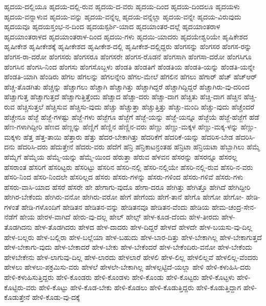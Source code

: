 {ಹೃದಯ-ದಲ್ಲಿಯೂ
ಹೃದಯ-ದಲ್ಲಿ-ರುವ
ಹೃದಯ-ದ-ವರು
ಹೃದಯ-ದಿಂದ
ಹೃದಯ-ದಿಂದಲೂ
ಹೃದಯಳು
ಹೃದಯ-ವನ್ನಾಳುವ
ಹೃದಯ-ವನ್ನು
ಹೃದಯ-ವನ್ನೆಲ್ಲ
ಹೃದಯ-ವನ್ನೆಲ್ಲಾ
ಹೃದಯ-ವನ್ನೇ
ಹೃದಯ-ವಿರುವುದು
ಹೃದಯವೂ
ಹೃದಯಸ್ತಂಭ-ನ-ದಿಂದ
ಹೃದಯಸ್ಪರ್ಶಿ-ಯಾದ
ಹೃದಯಾಂತರ-ದಲ್ಲೆ
ಹೃದಯಾಂತರಾಳ
ಹೃದಯಾಂತರಾಳದ
ಹೃದಯಾಂತರಾಳ-ದಿಂದ
ಹೃದಯಿ-ಗಳು
ಹೃದಯಿ-ಯಾದರು
ಹೃದಯೇಶ್ವರಿಯೇ
ಹೃಷಿಕೇಶದ
ಹೃಷೀಕೇಶ
ಹೃಷೀಕೇಶಕ್ಕೆ
ಹೃಷೀಕೇಶದ
ಹೃಷೀಕೇಶ-ದಲ್ಲಿ
ಹೃಷೀಕೇಶ-ದಲ್ಲಿದ್ದರು
ಹೆಂಗಸನ್ನು
ಹೆಂಗಸರ
ಹೆಂಗಸ-ರನ್ನು
ಹೆಂಗಸ-ರಾ-ದರೋ
ಹೆಂಗಸರು
ಹೆಂಗಸರೂ
ಹೆಂಗಸರೇ
ಹೆಂಗಸ-ರೊಡನೆ
ಹೆಂಗಸಾಗಿ
ಹೆಂಗಸಾ-ದರೋ
ಹೆಂಗಸಿಗೂ
ಹೆಂಗಸಿನ
ಹೆಂಗಸಿ-ನಿಂದ
ಹೆಂಗಸು
ಹೆಂಗಸೊಬ್ಬಳು
ಹೆಂಡತಿ
ಹೆಂಡತಿಗೆ
ಹೆಂಡತಿಯ
ಹೆಂಡತಿ-ಯನ್ನು
ಹೆಂಡತಿ-ಯನ್ನೇ
ಹೆಂಡತಿ-ಯಾಗಿ
ಹೆಂಡಿರು
ಹೆಗಲ
ಹೆಗಲನ್ನು
ಹೆಗಲನ್ನೇರಿ
ಹೆಗಲ-ಮೇಲೆ
ಹೆಗಲಿನ
ಹೆಗಲು
ಹೆಗಾರ್
ಹೆಚ್
ಹೆಚ್ಆರ್
ಹೆಚ್ಚ-ತೊಡಗಿತು
ಹೆಚ್ಚನ್ನು
ಹೆಚ್ಚಾಗಲು
ಹೆಚ್ಚಾಗಿ
ಹೆಚ್ಚಾಗಿತ್ತು
ಹೆಚ್ಚಾಗಿದ್ದರೆ
ಹೆಚ್ಚಾಗಿದ್ದಿದ್ದರೆ
ಹೆಚ್ಚಾಗಿರು-ವು-ದರಿಂದ
ಹೆಚ್ಚಾಗುತ್ತ
ಹೆಚ್ಚಾಗುತ್ತದೆ
ಹೆಚ್ಚಾಗುತ್ತಿತ್ತೆಂದು
ಹೆಚ್ಚಾದ
ಹೆಚ್ಚಾ-ದರು
ಹೆಚ್ಚಾ-ದಾಗ
ಹೆಚ್ಚಿತು
ಹೆಚ್ಚಿ-ದಾಗ
ಹೆಚ್ಚಿನ
ಹೆಚ್ಚಿ-ರುವ
ಹೆಚ್ಚಿಸುತ್ತಲೆ
ಹೆಚ್ಚಿಸುವ
ಹೆಚ್ಚಿಸು-ವುದು
ಹೆಚ್ಚು
ಹೆಚ್ಚುತ್ತಾ
ಹೆಚ್ಚುತ್ತಿತ್ತು
ಹೆಚ್ಚು-ಮಂದಿ
ಹೆಚ್ಚು-ವುದು
ಹೆಚ್ಚೆಂದರೆ
ಹೆಚ್ಚೇನೂ
ಹೆಜ್ಜೆ
ಹೆಜ್ಜೆ-ಗಳಷ್ಟು
ಹೆಜ್ಜೆ-ಗಳು
ಹೆಜ್ಜೆಗೂ
ಹೆಜ್ಜೆಗೆ
ಹೆಜ್ಜೆ-ಯನ್ನು
ಹೆಜ್ಜೆ-ಯನ್ನೂ
ಹೆಜ್ಜೆಯೆ
ಹೆಜ್ಜೆ-ಹೆಜ್ಜೆಗೆ
ಹೆಡೆ
ಹೆಣ-ಗಳಾಗಿದ್ದೀರಿ
ಹೆಣದ
ಹೆಣ್ಣನ್ನು
ಹೆಣ್ಣಿಗೆ
ಹೆಣ್ಣಿನ
ಹೆಣ್ಣಿನ-ವರು
ಹೆಣ್ಣು
ಹೆಣ್ಣು-ಮಕ್ಕಳ
ಹೆಣ್ಣು-ಮಕ್ಕ-ಳನ್ನು
ಹೆಣ್ಣು-ಮಕ್ಕಳು
ಹೆತ್ತ
ಹೆತ್ತ-ತಾಯಿ
ಹೆತ್ತಾರು
ಹೆತ್ತು
ಹೆದರ-ಬೇಕಾಗಿತ್ತು
ಹೆದರಿಕೆಗೆ
ಹೆದರಿಕೆ-ಯನ್ನು
ಹೆದರಿಸ-ಬೇಡ
ಹೆದರಿಸಿ-ದನು
ಹೆದರಿಸಿ-ದರು
ಹೆದುತ್ತೇನೆ
ಹೆದರು-ವರು
ಹೆದೆಗೆ
ಹೆನ್ರಿ
ಹೆನ್ರಿಕಾಟನ್ರಂತಹ
ಹೆನ್ರಿಟಾ
ಹೆನ್ರಿಯಟಾ
ಹೆಬ್ಬಾಗಿಲು
ಹೆಮ್ಮೆ
ಹೆಮ್ಮೆಗೆ
ಹೆಮ್ಮೆಯ
ಹೆಮ್ಮೆ-ಯನ್ನು
ಹೆಮ್ಮೆ-ಯಿಂದ
ಹೆರುತ್ತಾ
ಹೆರುವ
ಹೆಳವನ
ಹೆಸರನ್ನು
ಹೆಸರನ್ನೂ
ಹೆಸರಲ್ಲ
ಹೆಸರಾಂತ
ಹೆಸರಿಗೆ
ಹೆಸರಿಟ್ಟರು
ಹೆಸರಿಟ್ಟು
ಹೆಸರಿನ
ಹೆಸರಿ-ನಲ್ಲಿ
ಹೆಸರಿ-ನಲ್ಲಿಯೇ
ಹೆಸರಿ-ನಲ್ಲಿ-ರುವ
ಹೆಸರಿ-ನ-ವರು
ಹೆಸರಿ-ನಿಂದ
ಹೆಸರಿ-ನಿಂದಲೇ
ಹೆಸರಿಲ್ಲದ
ಹೆಸರು
ಹೆಸರು-ಗಳನ್ನು
ಹೆಸರು-ಗಳಿಂದ
ಹೆಸರು-ಗಳಿವೆ
ಹೆಸರು-ಗಳು
ಹೆಸರು-ವಾಸಿ-ಯಾದ
ಹೆಸರೆ
ಹೆಸರೇ
ಹೇ
ಹೇಗಾಗು-ವುದೊ
ಹೇಗಾ-ದರೂ
ಹೇಗಿತ್ತು
ಹೇಗಿತ್ತೊ
ಹೇಗಿದೆ
ಹೇಗಿದ್ದೀರಿ
ಹೇಗಿರ-ಬೇಕೆಂದು
ಹೇಗಿರು-ವನೋ
ಹೇಗಿರು-ವರೋ
ಹೇಗೆ
ಹೇಗೆಂದು
ಹೇಗೆ-ತಾನೆ
ಹೇಗೊ
ಹೇಗೋ
ಹೇಗೋ-
ಹೇಡಿ-ಗಳಂತೆ
ಹೇಡಿ-ಗಳೊಂದಿಗೆ
ಹೇಡಿತನ
ಹೇಡಿತನ-ವನ್ನು
ಹೇಡಿತನವೂ
ಹೇಡಿತನ-ವೆಂದು
ಹೇಡಿಯ
ಹೇಮ-ಚಂದ್ರ-ಸೇನ-ನೆಡೆಗೆ
ಹೇಯ
ಹೇರಳ-ವಾಗಿದೆ
ಹೇರು-ವು-ದಲ್ಲ
ಹೇಲ್
ಹೇಲ್ಸ್
ಹೇಳ-ಕೂಡ-ದೆಂದು
ಹೇಳ-ತೀರದು
ಹೇಳ-ತೊಡಗಿದನು
ಹೇಳ-ತೊಡಗಿದರು
ಹೇಳದ
ಹೇಳ-ದಾದರು
ಹೇಳ-ದಿದ್ದರೆ
ಹೇಳದೆ
ಹೇಳದೇ
ಹೇಳ-ಬಯಸು-ವು-ದಿಲ್ಲ
ಹೇಳ-ಬಲ್ಲರು
ಹೇಳ-ಬಲ್ಲಿರಾ
ಹೇಳ-ಬಲ್ಲೆಯಾ
ಹೇಳ-ಬಹುದು
ಹೇಳ-ಬಾರ-ದಿತ್ತು
ಹೇಳ-ಬೇಕಾಗಿಲ್ಲ
ಹೇಳ-ಬೇಕಾಗುತ್ತದೆ
ಹೇಳ-ಬೇಕಾಗು-ವುದು
ಹೇಳ-ಬೇಕಾದರೆ
ಹೇಳ-ಬೇಕು
ಹೇಳ-ಬೇಕೆಂದರೆ
ಹೇಳ-ಬೇಕೆಂದಿರು-ವನೋ
ಹೇಳ-ಬೇಕೆಂದು
ಹೇಳಬೇಕೇನು
ಹೇಳ-ಲಾಗುವು-ದಿಲ್ಲ
ಹೇಳ-ಲಾರದು
ಹೇಳಲಾರೆ
ಹೇಳಲಿ
ಹೇಳ-ಲಿಲ್ಲ
ಹೇಳಲಿಲ್ಲವೆ
ಹೇಳಲಿಲ್ಲ-ವೆಂದರು
ಹೇಳಲು
ಹೇಳಲು-ಪಕ್ರಮಿಸು-ವರು
ಹೇಳಲೆ
ಹೇಳಲೇ-ಬೇಕಾಗಿಲ್ಲ
ಹೇಳಲ್ಪಟ್ಟಿದೆ-ಯಲ್ಲಾ
ಹೇಳಿ
ಹೇಳಿ-ಕಳುಹಿಸಿ-ದರು
ಹೇಳಿ-ಕಳುಹಿಸುತ್ತಿದ್ದರು
ಹೇಳಿ-ಕೊಂಡರು
ಹೇಳಿ-ಕೊಂಡಳು
ಹೇಳಿ-ಕೊಂಡು
ಹೇಳಿ-ಕೊಟ್ಟರು
ಹೇಳಿ-ಕೊಟ್ಟಳು
ಹೇಳಿ-ಕೊಟ್ಟಿರು-ವರು
ಹೇಳಿ-ಕೊಟ್ಟು
ಹೇಳಿ-ಕೊಡ-ಬೇಕು
ಹೇಳಿ-ಕೊಡಲು
ಹೇಳಿ-ಕೊಡುತ್ತಿದ್ದರು
ಹೇಳಿ-ಕೊಡುತ್ತಿದ್ದಾಗ
ಹೇಳಿ-ಕೊಡುತ್ತೇನೆ
ಹೇಳಿ-ಕೊಡು-ವು-ದಕ್ಕೆ
}
